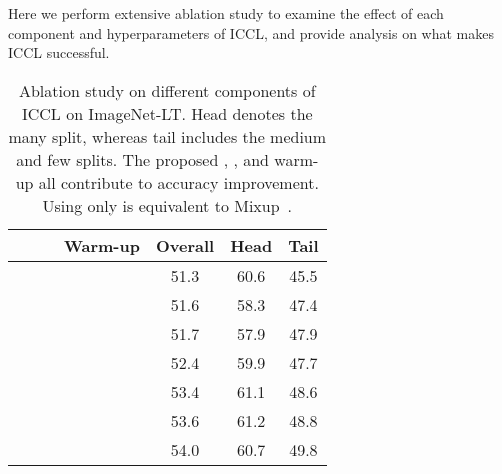 Here we perform extensive ablation study to examine the effect of each component and hyperparameters of ICCL, and provide analysis on what makes ICCL successful.
\begin{table}[!t]
\small

	\centering

	\begin{tabular}	{ c c c c |c c c }
	\hline	 	 
		     &  & &     Warm-up   &   Overall  & Head & Tail \\
	\hline	 
		 	\checkmark		& 				& 						& 		 	& 51.3       & 60.6 & 45.5\\
		 									& 		\checkmark			& 					&	& 51.6 & 58.3	 & 47.4 \\
								& 		\checkmark			& 					&	\checkmark		& 	51.7 & 57.9 &  47.9\\
			\checkmark	& 		 	& 		\checkmark			&\checkmark   	&   52.4  	       & 59.9 &  47.7\\
			\checkmark	& 		\checkmark		& 				& 	\checkmark	&  53.4             & 61.1 & 48.6\\
			\checkmark	& 		\checkmark		& 		\checkmark		&	  	&  53.6 & 61.2 & 48.8\\
			 \checkmark	& 		\checkmark		& 		\checkmark		&	\checkmark   	& 54.0    & 60.7 & 49.8\\
	\hline	 
	\end{tabular}

	
	\vspace{-1ex}
	\caption
		{\small	
		Ablation study on different components of ICCL on ImageNet-LT.
		Head denotes the many split, whereas tail includes the medium and few splits.
		The proposed , , and warm-up all contribute to accuracy improvement.
		Using only  is equivalent to Mixup~\cite{mixup}. 
		}
	\label{tbl:abt_component_new}
\vspace{-2ex}
\end{table}		
		
